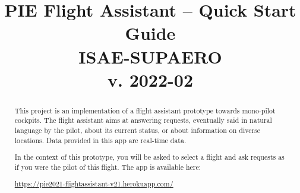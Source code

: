 \documentclass[12pt,oneside,a4]{article}
\title{PIE Flight Assistant -- Quick Start Guide\\ \vspace{.2em} \large{ISAE-SUPAERO} \\ \small{v. 2022-02}\\ \vspace{-4em}}
\author{
    }
\date{}
\newcommand{\linkdeploy}{https://pie2021-flightassistant-v21.herokuapp.com/}
\begin{document}
\maketitle
\vfill
\begin{center}
\end{center}
\vfill

\begin{abstract}
This project is an implementation of a flight assistant prototype towards mono-pilot cockpits.
The flight assistant aims at answering requests, eventually said in natural language by the pilot,
about its current status, or about information on diverse locations.
Data provided in this app are real-time data.

In the context of this prototype, you will be asked to select a flight and ask requests
as if you were the pilot of this flight.
The app is available here:
\begin{center}
    \vspace{-.5em}
    \url{\linkdeploy}
    \vspace{-.5em}
\end{center}
\end{abstract}

\clearpage
\tableofcontents

\clearpage

\end{document}
